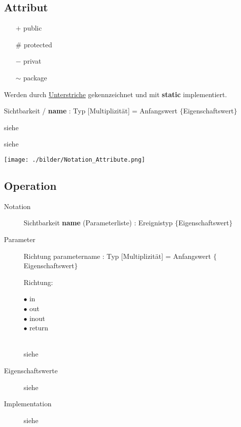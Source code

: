 \subsection{Attribut }
  \begin{description}
    \item[Sichtbarkeit]
      \begin{itemize}[leftmargin=0.5cm]
        \item[$+$] public
        \item[$\#$] protected
        \item[$-$] privat
        \item[$\sim$] package
      \end{itemize}
    \item[Klassenattribute]
      Werden durch \underline{Unterstriche} gekennzeichnet und mit \textbf{static} implementiert.
    \item[Notation]
      Sichtbarkeit / \textbf{name} : Typ [Multiplizität] = Anfangswert $\lbrace$Eigenschaftswert$\rbrace$ \\
    \parbox{6cm}{
      \item[Eigenschaftswerte]
        siehe 
      \item[Implementation]
        siehe  }
    \parbox{6cm}{\texttt{[image: ./bilder/Notation\_Attribute.png]}}
  \end{description}
  
  
\subsection{Operation }
  \begin{description}
    \item[Notation]
      Sichtbarkeit \textbf{name} (Parameterliste) : Ereignistyp $\lbrace$Eigenschaftswert$\rbrace$
    \item[Parameter]
      Richtung parametername : Typ [Multiplizität] = Anfangswert $\lbrace$Eigenschaftswert$\rbrace$ \\
      \parbox[t]{2cm}{Richtung: }
      \parbox[t]{2cm}{$\bullet$ in \\ $\bullet$ out \\ $\bullet$ inout \\ $\bullet$ return} \\
      siehe 
    \item[Eigenschaftswerte]
      siehe 
    \item[Implementation]
      siehe 
  \end{description}
  
